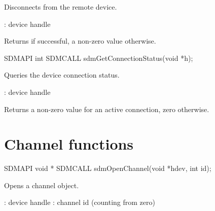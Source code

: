 \documentclass[a4paper,12pt,twoside,extrafontsizes]{memoir}
\begin{document}
\begin{funcdescr}
	Disconnects from the remote device.
\end{funcdescr}

\begin{funcparams}
	: device handle
\end{funcparams}

\begin{funcret}
	Returns  if successful, a non-zero value otherwise.
\end{funcret}



\begin{cfuncprototype}
SDMAPI int SDMCALL sdmGetConnectionStatus(void *h);
\end{cfuncprototype}

\begin{funcdescr}
	Queries the device connection status.
\end{funcdescr}

\begin{funcparams}
	: device handle
\end{funcparams}

\begin{funcret}
	Returns a non-zero value for an active connection, zero otherwise.
\end{funcret}

\section{Channel functions}
\label{sec:channelfunctions}



\begin{cfuncprototype}
SDMAPI void * SDMCALL sdmOpenChannel(void *hdev, int id);
\end{cfuncprototype}

\begin{funcdescr}
	Opens a channel object.
\end{funcdescr}

\begin{funcparams}
	: device handle
	: channel id (counting from zero)
\end{funcparams}
\end{document}
